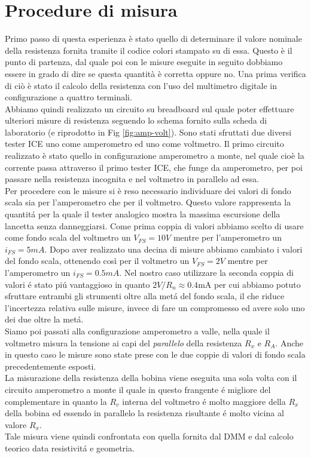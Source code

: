 \documentclass{article}
\begin{document}
\newpage

\section{Procedure di misura}
Primo passo di questa esperienza è stato quello di determinare il valore nominale della resistenza fornita tramite il codice colori stampato su di essa. Questo è il punto di partenza, dal quale poi con le misure eseguite in seguito dobbiamo essere in grado di dire se questa quantità è corretta oppure no. Una prima verifica di ciò è stato il calcolo della resistenza con l'uso del multimetro digitale in configurazione a quattro terminali. \\
Abbiamo quindi realizzato un circuito su breadboard sul quale poter effettuare ulteriori misure di resistenza seguendo lo schema fornito sulla scheda di laboratorio (e riprodotto in Fig \ref{fig:amp-volt}). Sono stati sfruttati due diversi tester ICE uno come amperometro ed uno come voltmetro. Il primo circuito realizzato è stato quello in configurazione amperometro a monte, nel quale cioè la corrente passa attraverso il primo tester ICE, che funge da amperometro, per poi passare nella resistenza incognita e nel voltmetro in parallelo ad essa.\\
Per procedere con le misure si è reso necessario individuare dei valori di fondo scala sia per l'amperometro che per il voltmetro. Questo valore rappresenta la quantit\'a per la quale il tester analogico mostra la massima escursione della lancetta senza danneggiarsi. Come prima coppia di valori abbiamo scelto di usare come fondo scala del voltmetro un \textit{$ V_{FS} = 10V$} mentre per l'amperometro un \textit{$i_{FS} = 5mA$}. Dopo aver realizzato una decina di misure abbiamo cambiato i valori del fondo scala, ottenendo così per il voltmetro un \textit{$ V_{FS} = 2V$} mentre per l'amperometro un \textit{$i_{FS} = 0.5mA$}. Nel nostro caso utilizzare la seconda coppia di valori \'e stato pi\'u vantaggioso in quanto $2V/R_n \approx 0.4 \si{\milli\ampere}$ per cui abbiamo potuto sfruttare entrambi gli strumenti oltre alla met\'a del fondo scala, il che riduce l'incertezza relativa sulle misure, invece di fare un compromesso ed avere solo uno dei due oltre la met\'a.\\
Siamo poi passati alla configurazione amperometro a valle, nella quale il voltmetro misura la tensione ai capi del \textit{parallelo} della resistenza $R_x$ e $R_A$. Anche in questo caso le misure sono state prese con le due coppie di valori di fondo scala precedentemente esposti.\\
La misurazione della resistenza della bobina viene eseguita una sola volta con il circuito amperometro a monte il quale in questo frangente \'e migliore del complementare in quanto la $R_v$ interna del voltmetro \'e molto maggiore della $R_x$ della bobina ed essendo in parallelo la resistenza risultante \'e molto vicina al valore $R_x$.\\
Tale misura viene quindi confrontata con quella fornita dal DMM e dal calcolo teorico data resistivit\'a e geometria.
\end{document}
